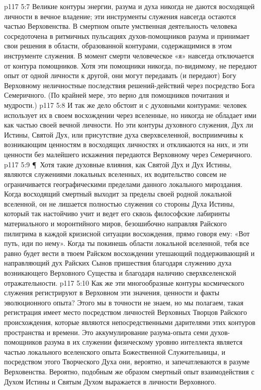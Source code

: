 \vs p117 5:7 Великие контуры энергии, разума и духа никогда не даются восходящей личности в вечное владение; эти инструменты служения навсегда остаются частью Верховенства. В смертном опыте умственная деятельность человека сосредоточена в ритмичных пульсациях духов\hyp{}помощников разума и принимает свои решения в области, образованной контурами, содержащимися в этом инструменте служения. В момент смерти человеческое «я» навсегда отключается от контура помощников. Хотя эти помощники никогда, по\hyp{}видимому, не передают опыт от одной личности к другой, они могут передавать (и передают) Богу Верховному неличностные последствия решений\hyp{}действий через посредство Бога Семеричного. (По крайней мере, это верно для помощников почитания и мудрости.)
\vs p117 5:8 И так же дело обстоит и с духовными контурами: человек использует их в своем восхождении через вселенные, но никогда не обладает ими как частью своей вечной личности. Но эти контуры духовного служения, Дух ли Истины, Святой Дух, или присутствие духа сверхвселенной, восприимчивы к возникающим ценностям в восходящих личностях и откликаются на них, и эти ценности без малейшего искажения передаются Верховному через Семеричного.
\vs p117 5:9 \P\ Хотя такие духовные влияния, как Святой Дух и Дух Истины, являются служениями локальных вселенных, их водительство совсем не ограничивается географическими пределами данного локального мироздания. Когда восходящий смертный выходит за пределы своей родной локальной вселенной, он не лишается полностью служения со стороны Духа Истины, который так настойчиво учит и ведет его сквозь философские лабиринты материального и моронтийного миров, безошибочно направляя Райского пилигрима в каждой кризисной ситуации восхождения, прямо говоря ему: «Вот путь, иди по нему». Когда ты покинешь области локальной вселенной, тебя все равно будет вести в твоем Райском восхождении утешающий поддерживающий и направляющий дух Райских Сынов пришествия благодаря служению духа возникающего Верховного Существа и благодаря наличию сверхвселенской отражательности.
\vs p117 5:10 Как же эти многообразные контуры космического служения регистрируют в Верховном эти значения, ценности и факты эволюционного опыта? Этого мы в точности не знаем, но мы полагаем, такая регистрация имеет место посредством личностей Верховных Творцов Райского происхождения, которые являются непосредственными дарителями этих контуров пространства и времени. Это аккумулирование разума\hyp{}опыта семи духов\hyp{}помощников разума в их служении физическому уровню интеллекта является частью локального вселенского опыта Божественной Служительницы, и посредством этого Творческого Духа они, вероятно, и запечатлеваются в разуме Верховенства. Вероятно, подобным же образом смертный опыт взаимодействия с Духом Истины и Святым Духом выражается в личности Верховного.
